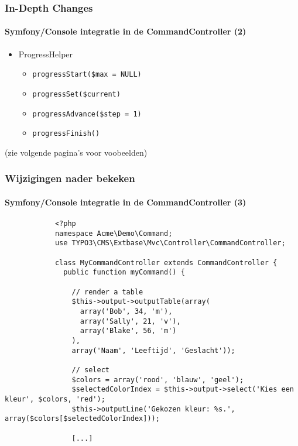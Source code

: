 \begin{frame}[fragile]
	\frametitle{In-Depth Changes}
	\framesubtitle{Symfony/Console integratie in de CommandController (2)}

	\lstset{basicstyle=\tiny\ttfamily}

	\begin{itemize}
		\item \smaller ProgressHelper
			\begin{itemize}
				\item \smaller\texttt{progressStart(\$max = NULL)}
				\item \texttt{progressSet(\$current)}
				\item \texttt{progressAdvance(\$step = 1)}
				\item \texttt{progressFinish()}
			\end{itemize}
	\end{itemize}

	\smaller
		(zie volgende pagina's voor voobeelden)
	\normalsize

\end{frame}


\begin{frame}[fragile]
	\frametitle{Wijzigingen nader bekeken}
	\framesubtitle{Symfony/Console integratie in de CommandController (3)}

	\lstset{basicstyle=\tiny\ttfamily}

		\begin{lstlisting}
			<?php
			namespace Acme\Demo\Command;
			use TYPO3\CMS\Extbase\Mvc\Controller\CommandController;

			class MyCommandController extends CommandController {
			  public function myCommand() {

			    // render a table
			    $this->output->outputTable(array(
			      array('Bob', 34, 'm'),
			      array('Sally', 21, 'v'),
			      array('Blake', 56, 'm')
			    ),
			    array('Naam', 'Leeftijd', 'Geslacht'));

			    // select
			    $colors = array('rood', 'blauw', 'geel');
			    $selectedColorIndex = $this->output->select('Kies een kleur', $colors, 'red');
			    $this->outputLine('Gekozen kleur: %s.', array($colors[$selectedColorIndex]));

			    [...]
		\end{lstlisting}

\end{frame}

